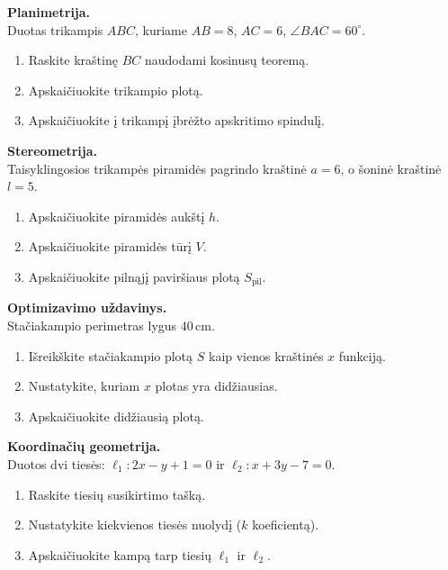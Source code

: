 \begin{exercise}
\textbf{Planimetrija.}\\
Duotas trikampis $ABC$, kuriame $AB = 8$, $AC = 6$, $\angle BAC = 60^\circ$.
\begin{enumerate}[label=\arabic*.]
  \item Raskite kraštinę $BC$ naudodami kosinusų teoremą.
  \item Apskaičiuokite trikampio plotą.
  \item Apskaičiuokite į trikampį įbrėžto apskritimo spindulį.
\end{enumerate}
\end{exercise}

\begin{exercise}
\textbf{Stereometrija.}\\
Taisyklingosios trikampės piramidės pagrindo kraštinė $a = 6$, o šoninė
kraštinė $l = 5$.
\begin{enumerate}[label=\arabic*.]
  \item Apskaičiuokite piramidės aukštį $h$.
  \item Apskaičiuokite piramidės tūrį $V$.
  \item Apskaičiuokite pilnąjį paviršiaus plotą $S_{\text{pil}}$.
\end{enumerate}
\end{exercise}

\begin{exercise}
\textbf{Optimizavimo uždavinys.}\\
Stačiakampio perimetras lygus $40$\,cm.
\begin{enumerate}[label=\arabic*.]
  \item Išreikškite stačiakampio plotą $S$ kaip vienos kraštinės $x$ funkciją.
  \item Nustatykite, kuriam $x$ plotas yra didžiausias.
  \item Apskaičiuokite didžiausią plotą.
\end{enumerate}
\end{exercise}

\begin{exercise}
\textbf{Koordinačių geometrija.}\\
Duotos dvi tiesės: $\ell_1\colon 2x - y + 1 = 0$ ir $\ell_2\colon x + 3y - 7 = 0$.
\begin{enumerate}[label=\arabic*.]
  \item Raskite tiesių susikirtimo tašką.
  \item Nustatykite kiekvienos tiesės nuolydį ($k$ koeficientą).
  \item Apskaičiuokite kampą tarp tiesių $\ell_1$ ir $\ell_2$.
\end{enumerate}
\end{exercise}

